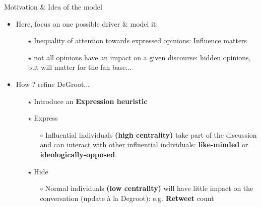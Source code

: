\documentclass[xcolor=table,handout]{beamer}
\begin{document}
\begin{frame}{Motivation \& Idea of the model}
\begin{itemize} \setlength\itemsep{1em}
	\item Here, focus on one possible driver \& model it: 
		\begin{itemize} \setlength\itemsep{1em}
			\item[$\star$] Inequality of attention towards expressed opinions: Influence matters
			\item[$\star$] not all opinions have an impact on a given discourse: hidden opinions, but will matter for the fan base... 
		\end{itemize}
	\item How ? refine DeGroot...
		\begin{itemize}  \setlength\itemsep{1em}
			\item[$\star$] Introduce an {\bf\color{purple}Expression heuristic}
			\item[$\star$] Express  \begin{itemize} \item[$\circ$] Influential individuals {\bf\color{purple}(high centrality)} take part of the discussion and can interact with other influential individuals: {\bf\color{purple}like-minded} or {\bf\color{purple}ideologically-opposed}. \end{itemize}
			\item[$\star$] Hide \begin{itemize} \item[$\circ$] Normal individuals {\bf\color{purple}(low centrality)} will have little impact on the conversation (update \`{a} la Degroot): e.g. {\bf\color{purple}Retweet} count  \end{itemize}
		\end{itemize}
\end{itemize}
\end{frame}
\end{document}
